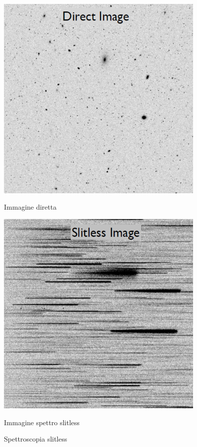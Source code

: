 \begin{figure}[htpb]
    \centering
    \begin{minipage}[c]{0.4\textwidth}
        \centering \setlength{\captionmargin}{0pt}
        \includegraphics[width=0.9\textwidth]{Immagini/Capitolo3/Telescopio_slitless_immagine.png}
        \caption*{Immagine diretta}
    \end{minipage}
    \hspace{5mm}
    \begin{minipage}[c]{0.4\textwidth}
        \centering \setlength{\captionmargin}{0pt}
        \includegraphics[width=0.9\textwidth]{Immagini/Capitolo3/Telescopio_slitless_spettro.png}
        \caption*{Immagine spettro slitless}
    \end{minipage}
    \caption{Spettroscopia slitless}
    \label{im:spettroscopia-slitless}
\end{figure}

